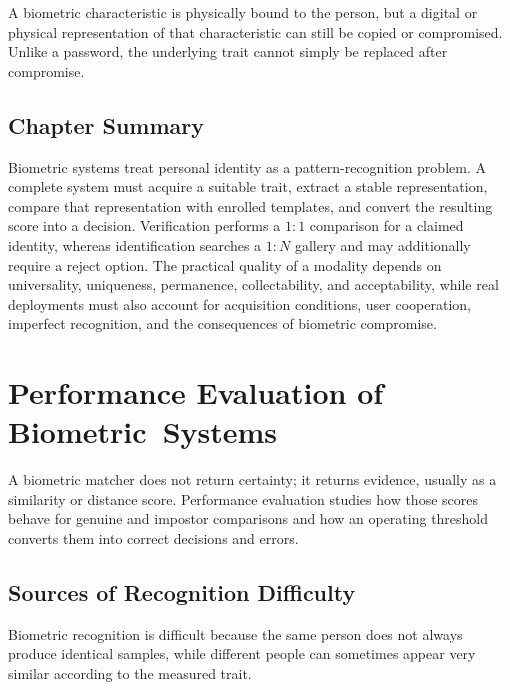 \documentclass[11pt,a4paper,oneside]{report}
\begin{document}
\begin{remarkbox}
A biometric characteristic is physically bound to the person, but a digital or physical representation of that characteristic can still be copied or compromised. Unlike a password, the underlying trait cannot simply be replaced after compromise.
\end{remarkbox}



\section{Chapter Summary}

Biometric systems treat personal identity as a pattern-recognition problem.
A complete system must acquire a suitable trait, extract a stable
representation, compare that representation with enrolled templates, and
convert the resulting score into a decision. Verification performs a
\(1{:}1\) comparison for a claimed identity, whereas identification searches
a \(1{:}N\) gallery and may additionally require a reject option. The
practical quality of a modality depends on universality, uniqueness,
permanence, collectability, and acceptability, while real deployments must
also account for acquisition conditions, user cooperation, imperfect
recognition, and the consequences of biometric compromise.

\chapter[Performance Evaluation of Biometric Systems]{Performance Evaluation of \mbox{Biometric Systems}}
\label{sec:performance}

A biometric matcher does not return certainty; it returns evidence, usually
as a similarity or distance score. Performance evaluation studies how those
scores behave for genuine and impostor comparisons and how an operating
threshold converts them into correct decisions and errors.


\section{Sources of Recognition Difficulty}
\label{subsec:difficulties}

Biometric recognition is difficult because the same person does not
always produce identical samples, while different people can sometimes
appear very similar according to the measured trait.
\end{document}
